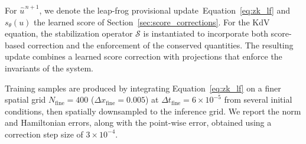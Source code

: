 \documentclass[letterpaper]{article} %
\def\Eqref#1{Equation~\ref{#1}}
\providecommand{\Eqref}[1]{\Cref{#1}}
\begin{document}
For \(\hat{u}^{\,n+1}\), we denote the leap-frog provisional update~\Eqref{eq:zk_lf}
and $s_\theta(u)$ the learned score
of Section~\ref{sec:score_corrections}.
For the KdV equation, the stabilization operator $\mathcal{S}$ is instantiated to incorporate both score-based correction and the enforcement of the conserved quantities. The resulting update combines a learned score correction with projections that enforce the invariants of the system.





Training samples are produced by
integrating \Eqref{eq:zk_lf} on a finer spatial grid
\(N_{\mathrm{fine}}\!=\!400\) ($\Delta x_{\mathrm{fine}}\!=\!0.005$) at
\(\Delta t_{\mathrm{fine}}\!=\!6\!\times\!10^{-5}\) from several
initial conditions, then spatially downsampled to the inference grid. We report the norm and Hamiltonian errors, along with the point-wise error,
obtained using a correction step size of $3{\times}10^{-4}$.
\end{document}
